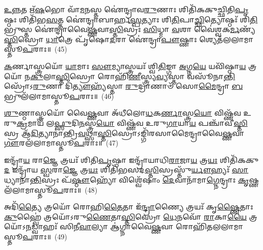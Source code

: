 {\anuvakamend[{}]}%

\-\ul{𑌉}\-\-\ul{𑌨𑍍𑌨}\-𑌤 𑌋᳴\-\ul{𑌷}\-𑌭𑍋 𑌵𑌾᳴\-\ul{𑌮}\-𑌨𑌸𑍍𑌤 𑌐॑𑌨𑍍𑌦𑍍𑌰𑌾𑌵\-\ul{𑌰𑍁}\-𑌣𑌾𑌃 𑌶𑌿𑌤𑌿᳴𑌕𑌕𑍁𑌚𑍍𑌛𑌿𑌤𑌿\-\ul{𑌪𑍃}\-𑌷𑍍𑌠𑌃 𑌶𑌿𑌤𑌿᳴𑌭\-\ul{𑌸}\-𑌤𑍍𑌤 𑌐॑𑌨𑍍𑌦𑍍𑌰𑌾𑌬𑌾𑌰𑍍\mbox{}𑌹\-\ul{𑌸𑍍𑌪}\-𑌤𑍍𑌯𑌾𑌃 𑌶𑌿\-\ul{𑌤𑌿}\-𑌪𑌾\-\ul{𑌚𑍍𑌛𑌿}\-𑌤𑍍𑌯𑍋𑌷𑍍𑌠𑌃᳴ 𑌶𑌿\-\ul{𑌤𑌿}\-𑌭𑍍𑌰𑍁𑌸𑍍𑌤 𑌐॑𑌨𑍍𑌦𑍍𑌰𑌾𑌵𑍈\-\ul{𑌷𑍍𑌣}\-𑌵𑌾\-\ul{𑌸𑍍𑌤𑌿}\-𑌸𑍍𑌰𑌃 \ul{𑌸𑌿}\-𑌧𑍍𑌮𑌾 \ul{𑌵}\-𑌶𑌾 𑌵𑍈॑𑌶𑍍𑌵𑌕\-\ul{𑌰𑍍𑌮}\-𑌣𑍍𑌯᳴\-\ul{𑌸𑍍𑌤𑌿}\-𑌸𑍍𑌰𑍋 \ul{𑌧𑌾}\-𑌤𑍍𑌰𑍇 𑌪𑍃᳴𑌷𑍋\-\ul{𑌦}\-𑌰𑌾 𑌐॑𑌨𑍍𑌦𑍍𑌰𑌾\-\ul{𑌪𑍗}\-𑌷𑍍𑌣𑌾𑌃 𑌶𑍍𑌯𑍇𑌤᳴𑌲𑌲𑌾𑌮𑌾𑌸𑍍𑌤𑍂\-\ul{𑌪}\-𑌰𑌾𑌃॥~(45)

{\anuvakamend[{\-\ul{𑌶𑌿}\-\-\ul{𑌤𑌿}\-\-\ul{𑌬𑌾}\-𑌹𑍁𑌰𑍁᳴\-\ul{𑌨𑍍𑌨}\-𑌤𑌃 𑌪𑌞𑍍𑌚᳴𑌵𑌿𑍞𑌶\-\ul{𑌤𑌿𑌃} 𑌪𑌞𑍍𑌚᳴𑌵𑌿𑍞𑌶𑌤𑌿𑌃}]}%

\-\ul{𑌕}\-𑌰𑍍𑌣𑌾𑌸𑍍𑌤𑍍𑌰𑌯𑍋᳴ \ul{𑌯𑌾}\-𑌮𑌾𑌃 \ul{𑌸𑍗}\-𑌮𑍍𑌯𑌾𑌸𑍍𑌤𑍍𑌰𑌯𑌃᳴ 𑌶𑍍𑌵𑌿\-\ul{𑌤𑌿}\-𑌙𑍍𑌗𑌾 \ul{𑌅}\-𑌗𑍍𑌨\-\ul{𑌯𑍇} 𑌯𑌵𑌿᳴𑌷𑍍𑌠𑌾\-\ul{𑌯} 𑌤𑍍𑌰𑌯𑍋᳴ 𑌨\-\ul{𑌕𑍁}\-𑌲𑌾\-\ul{𑌸𑍍𑌤𑌿}\-𑌸𑍍𑌰𑍋 𑌰𑍋𑌹𑌿᳴\-\ul{𑌣𑍀}\-𑌸𑍍𑌤𑍍𑌰𑍍𑌯\-\ul{𑌵𑍍𑌯}\-𑌸𑍍𑌤𑌾 𑌵𑌸𑍂᳴𑌨𑌾\-\ul{𑌨𑍍𑌤𑌿}\-𑌸𑍍𑌰𑍋᳴\-𑌽\-\ul{𑌰𑍁}\-𑌣𑌾 𑌦𑌿᳴\-\ul{𑌤𑍍𑌯𑍗}\-𑌹𑍍𑌯᳴𑌸𑍍𑌤𑌾 \ul{𑌰𑍁}\-𑌦𑍍𑌰𑌾𑌣𑌾𑍞᳴ 𑌸𑍋\-\ul{𑌮𑍈}\-𑌨𑍍𑌦𑍍𑌰𑌾 \ul{𑌬}\-𑌭𑍍𑌰𑍁𑌲᳴𑌲𑌾𑌮𑌾𑌸𑍍𑌤𑍂\-\ul{𑌪}\-𑌰𑌾𑌃॥~(46)

{\anuvakamend[{\-\ul{𑌕}\-𑌰𑍍𑌣𑌾𑌸𑍍𑌤𑍍𑌰𑌯𑍋᳴𑌵𑌿𑍞𑌶𑌤𑌿𑌃}]}%

\-\ul{𑌶𑍁}\-𑌣𑍍𑌠𑌾𑌸𑍍𑌤𑍍𑌰𑌯𑍋᳴ 𑌵𑍈\-\ul{𑌷𑍍𑌣}\-𑌵𑌾 𑌅᳴𑌧𑍀𑌲𑍋\-\ul{𑌧}\-𑌕\-\ul{𑌰𑍍𑌣𑌾}\-𑌸𑍍𑌤𑍍𑌰\-\ul{𑌯𑍋} 𑌵𑌿𑌷𑍍𑌣᳴𑌵 𑌉𑌰𑍁\-\ul{𑌕𑍍𑌰}\-𑌮𑌾𑌯᳴ 𑌲\-\ul{𑌫𑍍𑌸𑍁}\-𑌦𑌿\-\ul{𑌨}\-𑌸𑍍𑌤𑍍𑌰\-\ul{𑌯𑍋} 𑌵𑌿𑌷𑍍𑌣᳴𑌵 𑌉𑌰𑍁\-\ul{𑌗𑌾}\-𑌯𑌾\-\ul{𑌯} 𑌪𑌞𑍍𑌚𑌾᳴𑌵𑍀\-\ul{𑌸𑍍𑌤𑌿}\-𑌸𑍍𑌰 𑌆᳴\-\ul{𑌦𑌿}\-𑌤𑍍𑌯𑌾𑌨𑌾॑𑌨𑍍𑌤𑍍𑌰𑌿\-\ul{𑌵}\-𑌥𑍍𑌸𑌾\-\ul{𑌸𑍍𑌤𑌿}\-𑌸𑍍𑌰𑍋\-𑌽𑌙𑍍𑌗𑌿᳴𑌰𑌸𑌾𑌮𑍈𑌨𑍍𑌦𑍍𑌰𑌾𑌵𑍈\-\ul{𑌷𑍍𑌣}\-𑌵𑌾 \ul{𑌗𑍗}\-𑌰𑌲᳴𑌲𑌾𑌮𑌾𑌸𑍍𑌤𑍂\-\ul{𑌪}\-𑌰𑌾𑌃॥~(47)

{\anuvakamend[{\-\ul{𑌶𑍁}\-𑌣𑍍𑌠𑌾 𑌵𑌿𑍞᳴\-\ul{𑌶}\-𑌤𑌿𑌃}]}%

𑌇𑌨𑍍𑌦𑍍𑌰𑌾᳴\-\ul{𑌯} 𑌰𑌾\-\ul{𑌜𑍍𑌞𑍇} 𑌤𑍍𑌰𑌯𑌃᳴ 𑌶𑌿𑌤𑌿\-\ul{𑌪𑍃}\-𑌷𑍍𑌠𑌾 𑌇𑌨𑍍𑌦𑍍𑌰𑌾᳴𑌯𑌾𑌧𑌿\-\ul{𑌰𑌾}\-𑌜𑌾\-\ul{𑌯} 𑌤𑍍𑌰\-\ul{𑌯𑌃} 𑌶𑌿𑌤𑌿᳴𑌕𑌕𑍁\-\ul{𑌦} 𑌇𑌨𑍍𑌦𑍍𑌰𑌾᳴𑌯 \ul{𑌸𑍍𑌵}\-𑌰𑌾\-\ul{𑌜𑍍𑌞𑍇} 𑌤𑍍𑌰\-\ul{𑌯𑌃} 𑌶𑌿𑌤𑌿᳴𑌭𑌸𑌦\-\ul{𑌸𑍍𑌤𑌿}\-𑌸𑍍𑌰𑌸𑍍𑌤𑍁᳴\-\ul{𑌰𑍍𑌯𑍗}\-𑌹𑍍𑌯𑌃᳴ \ul{𑌸𑌾}\-𑌧𑍍𑌯𑌾𑌨𑌾॑\-\ul{𑌨𑍍𑌤𑌿}\-𑌸𑍍𑌰𑌃 𑌪᳴\-\ul{𑌷𑍍𑌠𑍗}\-𑌹𑍍𑌯𑍋᳴ 𑌵𑌿𑌶𑍍𑌵𑍇᳴𑌷𑌾𑌂 \ul{𑌦𑍇}\-𑌵𑌾𑌨𑌾᳴𑌮𑌾\-\ul{𑌗𑍍𑌨𑍇}\-𑌨𑍍𑌦𑍍𑌰𑌾𑌃 \ul{𑌕𑍃}\-𑌷𑍍𑌣𑌲᳴𑌲𑌾𑌮𑌾𑌸𑍍𑌤𑍂\-\ul{𑌪}\-𑌰𑌾𑌃॥~(48)

{\anuvakamend[{𑌇𑌨𑍍𑌦𑍍𑌰𑌾᳴\-\ul{𑌯} 𑌰𑌾\-\ul{𑌜𑍍𑌞𑍇} 𑌦𑍍𑌵𑌾𑌵𑌿𑍞᳴𑌶𑌤𑌿𑌃}]}%

𑌅𑌦𑌿᳴\-\ul{𑌤𑍍𑌯𑍈} 𑌤𑍍𑌰𑌯𑍋᳴ 𑌰𑍋𑌹𑌿\-\ul{𑌤𑍈}\-𑌤𑌾 𑌇᳴\-\ul{𑌨𑍍𑌦𑍍𑌰𑌾}\-𑌣𑍍𑌯𑍈 𑌤𑍍𑌰𑌯𑌃᳴ 𑌕𑍃\-\ul{𑌷𑍍𑌣𑍈}\-𑌤𑌾𑌃 \ul{𑌕𑍁}\-𑌹𑍍𑌵𑍈॑ 𑌤𑍍𑌰𑌯𑍋᳴\-𑌽𑌰𑍁\-\ul{𑌣𑍈}\-𑌤𑌾\-\ul{𑌸𑍍𑌤𑌿}\-𑌸𑍍𑌰𑍋 \ul{𑌧𑍇}\-𑌨𑌵𑍋᳴ \ul{𑌰𑌾}\-𑌕𑌾\-\ul{𑌯𑍈} 𑌤𑍍𑌰𑌯𑍋᳴\-𑌽\-\ul{𑌨}\-𑌡𑍍𑌵𑌾𑌹𑌃᳴ 𑌸𑌿𑌨𑍀\-\ul{𑌵𑌾}\-𑌲𑍍𑌯𑌾 𑌆॑𑌗𑍍𑌨𑌾𑌵𑍈\-\ul{𑌷𑍍𑌣}\-𑌵𑌾 𑌰𑍋𑌹𑌿᳴𑌤𑌲𑌲𑌾𑌮𑌾𑌸𑍍𑌤𑍂\-\ul{𑌪}\-𑌰𑌾𑌃॥~(49)

{\anuvakamend[{𑌅𑌦𑌿᳴𑌤𑍍𑌯𑌾 \ul{𑌅}\-𑌷𑍍𑌟𑌾𑌦᳴𑌶}]}%

